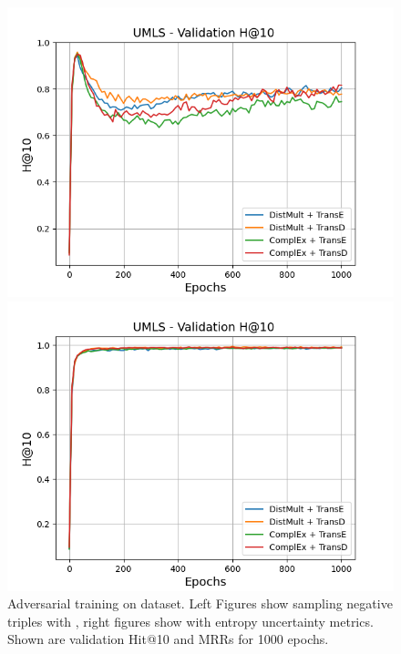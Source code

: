 \begin{figure}
\begin{minipage}{.5\textwidth}
    \end{minipage}
    \begin{minipage}{.5\textwidth}
      \centering
      \includegraphics[width=0.9\linewidth]{figures/results/gan_train/not_pretrained/random/umls/epochs1000/random_umls_hit10.png}
    \end{minipage}%
    \begin{minipage}{.5\textwidth}
      \centering
      \includegraphics[width=0.9\linewidth]{figures/results/gan_train/not_pretrained/uncertainty/max_distribution/entropy/umls/1k_epochs/uncertainty_umls_hit10.png}
    \end{minipage}%
    \caption{Adversarial training on \umls dataset. 
    Left Figures show sampling negative triples with \origsampling, right figures show \ussoftmax with entropy uncertainty metrics.
    Shown are validation Hit@10 and MRRs for 1000 epochs.}
    \label{fig:advtrain_umls_random_vs_uncertainty}
\end{figure}
